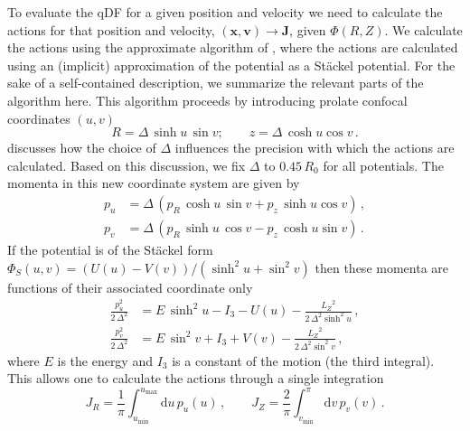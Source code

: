 \documentclass{emulateapj}
\newcommand{\dd}{\mathrm{d}}
\renewcommand{\vec}[1]{\ensuremath{\mathbf{#1}}}
\newcommand{\vecx}{\ensuremath{\vec{x}}}
\newcommand{\vecv}{\ensuremath{\vec{v}}}
\newcommand{\vecj}{\ensuremath{\vec{J}}}
\newcommand{\jr}{\ensuremath{J_R}}
\newcommand{\jz}{\ensuremath{J_Z}}
\newcommand{\lz}{\ensuremath{L_Z}}
\begin{document}
To evaluate the qDF for a given position and velocity we need to
calculate the actions for that position and velocity, $(\vecx,\vecv)
\rightarrow \vecj$, given $\Phi(R,Z)$. We calculate the actions using
the approximate algorithm of \citet{Binney12a}, where the actions are
calculated using an (implicit) approximation of the potential as a
St\"{a}ckel potential. For the sake of a self-contained description,
we summarize the relevant parts of the algorithm here. This algorithm
proceeds by introducing prolate confocal coordinates $(u,v)$
\begin{equation}
  R = \Delta \,\sinh u\,\sin v; \qquad z = \Delta \,\cosh u \cos v\,.
\end{equation}
\citet{Binney12a} discusses how the choice of $\Delta$ influences the
precision with which the actions are calculated. Based on this
discussion, we fix $\Delta$ to $0.45\,R_0$ for all potentials. The
momenta in this new coordinate system are given by
\begin{align}
  p_u & = \Delta \,(p_R\,\cosh u \,\sin v + p_z\,\sinh u \cos v)\,,\\
  p_v & = \Delta \,(p_R\,\sinh u \,\cos v - p_z\,\cosh u \sin v)\,.
\end{align}
If the potential is of the St\"{a}ckel form $\Phi_S(u,v) =
(U(u)-V(v))/(\sinh^2 u + \sin^2 v)$ then these momenta are functions
of their associated coordinate only
\begin{align}\label{eq:pupv}
  \frac{p_u^2}{2\,\Delta^2} & = E\,\sinh^2 u - I_3 - U(u) - \frac{\lz^2}{2\,\Delta^2\sinh^2 u}\,,\\
  \frac{p_v^2}{2\,\Delta^2} & = E\,\sin^2 v + I_3 + V(v) - \frac{\lz^2}{2\,\Delta^2\sin^2 v}\,,\label{eq:pupv2}
\end{align}
where $E$ is the energy and $I_3$ is a constant of the motion (the
third integral). This allows one to calculate the actions through a
single integration
\begin{equation}\label{eq:jrjzint}
  \jr = \frac{1}{\pi} \int_{u_\mathrm{min}}^{u_{\mathrm{max}}} \dd u \,p_u(u)\,,\qquad 
  \jz = \frac{2}{\pi} \int_{v_\mathrm{min}}^{\pi} \dd v \,p_v(v)\,.
\end{equation}
\end{document}
